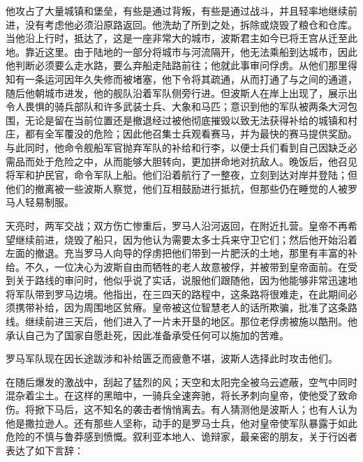 他攻占了大量城镇和堡垒，有些是通过背叛，有些是通过战斗，并且轻率地继续前进，没有考虑他必须沿原路返回。他洗劫了所到之处，拆除或烧毁了粮仓和仓库。当他沿上行时，抵达了，这是一座非常大的城市，波斯君主如今已将王宫从迁至此地。靠近这里。由于陆地的一部分将城市与河流隔开，他无法乘船到达城市，因此他判断必须要么走水路，要么弃船走陆路前往；他就此事审问俘虏。从他们那里得知有一条运河因年久失修而被堵塞，他下令将其疏通，从而打通了与之间的通道，随后他朝城市进发，他的舰队沿着军队侧旁行进。但波斯人在岸上出现了，展示出令人畏惧的骑兵部队和许多武装士兵、大象和马匹；意识到他的军队被两条大河包围，无论是留在当前位置还是撤退经过被他彻底摧毁以致无法获得补给的城镇和村庄，都有全军覆没的危险；因此他召集士兵观看赛马，并为最快的赛马提供奖励。与此同时，他命令舰船军官抛弃军队的补给和行李，以便士兵们看到自己因缺乏必需品而处于危险之中，从而能够大胆转向，更加拼命地对抗敌人。晚饭后，他召见将军和护民官，命令军队上船。他们沿着航行了一整夜，立刻到达对岸并登陆；但他们的撤离被一些波斯人察觉，他们互相鼓励进行抵抗，但那些仍在睡觉的人被罗马人轻易制服。\par

天亮时，两军交战；双方伤亡惨重后，罗马人沿河返回，在附近扎营。皇帝不再希望继续前进，烧毁了船只，因为他认为需要太多士兵来守卫它们；然后他开始沿着左面的撤退。充当罗马人向导的俘虏把他们带到一片肥沃的土地，那里有丰富的补给。不久，一位决心为波斯自由而牺牲的老人故意被俘，并被带到皇帝面前。在受到关于路线的审问时，他似乎说了实话，说服他们跟随他，因为他能够非常迅速地将军队带到罗马边境。他指出，在三四天的路程中，这条路将很难走，在此期间必须携带补给，因为周围地区贫瘠。皇帝被这位智慧老人的话所欺骗，批准了这条路线。继续前进三天后，他们进入了一片未开垦的地区。那位老俘虏被施以酷刑。他承认自己为了国家自愿赴死，因此准备承受任何可以施加的苦难。\par

罗马军队现在因长途跋涉和补给匮乏而疲惫不堪，波斯人选择此时攻击他们。\par

在随后爆发的激战中，刮起了猛烈的风；天空和太阳完全被乌云遮蔽，空气中同时混杂着尘土。在这样的黑暗中，一骑兵全速奔驰，将长矛刺向皇帝，使他受了致命伤。将掀下马后，这不知名的袭击者悄悄离去。有人猜测他是波斯人；也有人认为他是撒拉逊人。还有那些人坚称，动手的是罗马士兵，他对皇帝使军队暴露于如此危险的不慎与鲁莽感到愤慨。叙利亚本地人、诡辩家，最亲密的朋友，关于行凶者表达了如下言辞：\par

